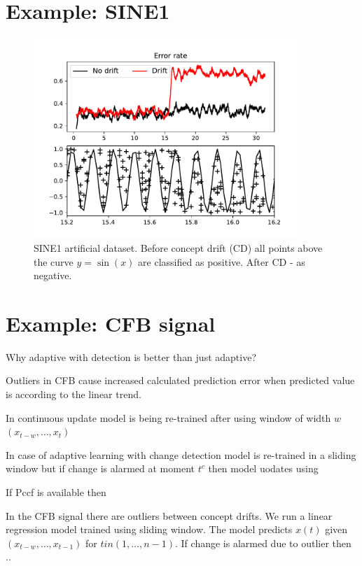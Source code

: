 \documentclass[doctoral,utf8,lot,loar,lof,shortloft,index]{jydiss}
\begin{document}
\section{Example: SINE1}
\begin{figure}[!htb]
	\centering
	\includegraphics[width=0.9\textwidth]{images/cd_example_sine1}
	\caption{SINE1 artificial dataset. 
		Before concept drift (CD) all points above the curve $y=\sin(x)$ are classified as positive.
After CD - as negative.	
}\label{fig:sine1}
\end{figure}

\section{Example: CFB signal}

Why adaptive with detection is better than just adaptive?

Outliers in CFB cause increased calculated prediction error when predicted value is according to the linear trend. 

In continuous update model is being re-trained after
using window of width $w$ $(x_{t-w}, \dots, x_{t})$

In case of adaptive learning with change detection model is re-trained in a sliding window but if change is alarmed at moment $t^c$ then model uodates using 

If Pccf is available then 

In the CFB signal there are outliers between concept drifts.
We run a linear regression model trained using sliding window.
The model predicts $x(t)$ given $(x_{t-w}, \dots, x_{t-1})$ for $t in (1, \dots, n-1)$.
If change is alarmed due to outlier then ..
\end{document}
